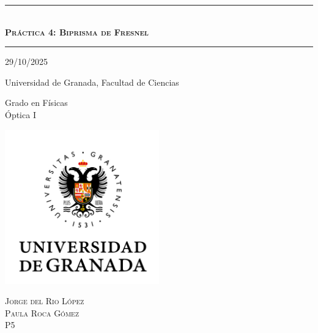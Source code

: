 \documentclass[10pt,onecolumn]{article}
\begin{document}
\renewcommand{\headrulewidth}{0.5pt}
\newcommand{\HRule}[1]{\rule{\linewidth}{#1}}
\renewcommand{\refname}{Bibliografía}
\renewcommand{\tablename}{Tabla}
\renewcommand{\contentsname}{Índice}
\renewcommand{\figurename}{Figura}

\onecolumn
\begin{titlepage}
\centering
    {\HRule{2 pt}} \\
    \vspace{0.5cm}
    {\scshape\Huge {\textbf{Práctica 4: Biprisma de Fresnel}  }}  \\
    \vspace{1 mm}
    
    {\HRule{2 pt}}

    \vspace{1cm}
    \Large 29/10/2025 \\
    \vspace{1cm}
 
    \normalfont\Large Universidad de Granada, Facultad de Ciencias \\
    \vspace{0.5cm}
    
    
     \normalfont\Large Grado en Físicas \\
    \vspace{0.5cm}
    \normalfont Óptica I\\%
    \vspace{1.5cm}

\centering
    {\includegraphics[width=0.5\textwidth]{UGR-MARCA-01-color.jpg}\par}

\vfill
    \vspace{1cm}
    \scshape\Large Jorge del Rio López \\
    \scshape\Large Paula Roca Gómez\\

    \vspace{0.5cm}
    \scshape\Large P5

\vfill

\end{titlepage}
\end{document}
